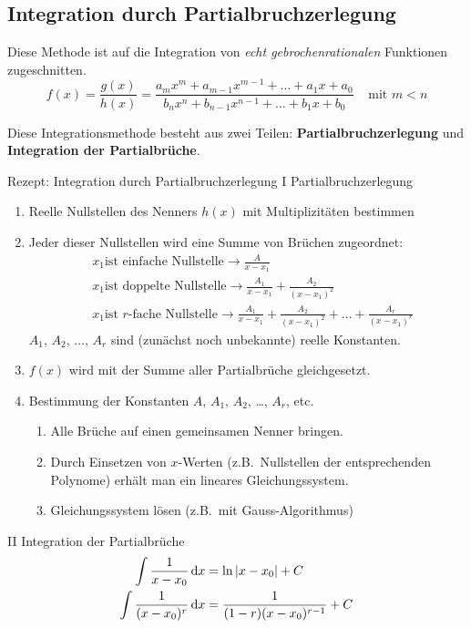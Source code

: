 \subsection{Integration durch Partialbruchzerlegung}\label{subsec:integration-durch-partialbruchzerlegung}

Diese Methode ist auf die Integration von \emph{echt gebrochenrationalen} Funktionen zugeschnitten. \[ f(x) = \frac{g(x)}{h(x)} = \frac{a_m x^m + a_{m-1} x^{m-1} + \dots + a_1 x + a_0}{b_n x^n + b_{n-1} x^{n-1} + \dots + b_1 x + b_0} \;\;\;\; \text{mit $m < n$}
\]

Diese Integrationsmethode besteht aus zwei Teilen: \textbf{Partialbruchzerlegung} und \textbf{Integration der Partialbrüche}.

\begin{definition}{Rezept: Integration durch Partialbruchzerlegung}
    I Partialbruchzerlegung
    \begin{enumerate}
        \item Reelle Nullstellen des Nenners $h(x)$ mit Multiplizitäten bestimmen
        \item Jeder dieser Nullstellen wird eine Summe von Brüchen zugeordnet:
        \begin{align*}
            &x_1 \text{ist einfache Nullstelle} \rightarrow \frac{A}{x - x_1} \\
            &x_1 \text{ist doppelte Nullstelle} \rightarrow \frac{A_1}{x - x_1} + \frac{A_2}{(x - x_1)^2} \\
            &x_1 \text{ist $r$-fache Nullstelle} \rightarrow \frac{A_1}{x - x_1} + \frac{A_2}{(x - x_1)^2} + \dots + \frac{A_r}{(x - x_1)^r}
        \end{align*} $A_1$, $A_2$, $\dots$, $A_r$ sind (zunächst noch unbekannte) reelle Konstanten.
        \item $f(x)$ wird mit der Summe aller Partialbrüche gleichgesetzt.
        \item Bestimmung der Konstanten $A$, $A_1$, $A_2$, \dots, $A_r$, etc.
        \begin{enumerate}
            [label=(\roman*)]
            \item Alle Brüche auf einen gemeinsamen Nenner bringen.
            \item Durch Einsetzen von $x$-Werten (z.B.\ Nullstellen der entsprechenden Polynome) erhält man ein lineares Gleichungssystem.
            \item Gleichungssystem lösen (z.B.\ mit Gauss-Algorithmus)
        \end{enumerate}
    \end{enumerate}
    II Integration der Partialbrüche
    \begin{align*}
        \int \frac{1}{x - x_0} \,\mathrm{d}x &= \ln |x - x_0| + C \\
        \int \frac{1}{(x - x_0)^r} \,\mathrm{d}x &= \frac{1}{(1 - r)(x - x_0)^{r-1}} + C
    \end{align*}
\end{definition}

